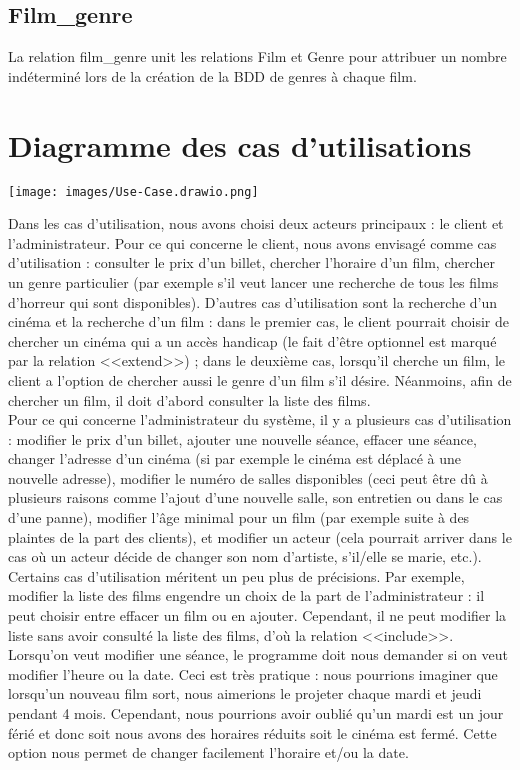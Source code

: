\documentclass[12pt]{article}
\begin{document}
\subsection{Film{\_}genre}
La relation film{\_}genre unit les relations Film et Genre pour attribuer un nombre indéterminé lors de la création de la BDD de genres à chaque film.
\section{Diagramme des cas d'utilisations}
\texttt{[image: images/Use-Case.drawio.png]}


Dans les cas d’utilisation, nous avons choisi deux acteurs principaux : 
le client et l’administrateur.  
Pour ce qui concerne le client, 
nous avons envisagé comme cas d’utilisation : 
consulter le prix d’un billet, chercher l’horaire d’un film, 
chercher un genre particulier (par exemple s’il veut lancer une 
recherche de tous les films d’horreur qui sont disponibles). 
D'autres cas d’utilisation sont la recherche d’un cinéma et la recherche 
d’un film : dans le premier cas, le client pourrait choisir de 
chercher un cinéma qui a un accès handicap (le fait d’être optionnel est 
marqué par la relation <<extend>>) ; dans le deuxième cas, lorsqu’il 
cherche un film, le client a l’option de chercher aussi le genre d’un film 
s’il désire. Néanmoins, afin de chercher un film, il doit d’abord consulter 
la liste des films.  \\
 
Pour ce qui concerne l’administrateur du système, il y a plusieurs cas d’utilisation 
: modifier le prix d’un billet, ajouter une nouvelle séance,
 effacer une séance, changer l’adresse d’un cinéma 
 (si par exemple le cinéma est déplacé à une nouvelle adresse), 
 modifier le numéro de salles disponibles (ceci peut être dû à plusieurs raisons comme 
 l’ajout d’une nouvelle salle, son entretien ou dans le cas d’une panne), modifier 
 l’âge minimal pour un film (par exemple suite à des plaintes de la part des clients), 
 et modifier un acteur (cela pourrait arriver dans le cas où un acteur décide de 
 changer son nom d'artiste, s’il/elle se marie, etc.). 
 Certains cas d’utilisation méritent un peu plus de précisions. 
 Par exemple, modifier la liste des films engendre un choix de la part 
 de l’administrateur : il peut choisir entre effacer un film ou en ajouter. Cependant, il ne peut modifier la liste sans avoir consulté la liste des films, d’où la relation <<include>>. Lorsqu’on veut modifier une séance, le programme doit nous demander si on veut modifier l’heure ou la date. Ceci est très pratique : nous pourrions imaginer que lorsqu’un nouveau film sort, nous aimerions le projeter chaque mardi et jeudi pendant 4 mois. Cependant, nous pourrions avoir oublié qu’un mardi est un jour férié et donc soit nous avons des horaires réduits soit le cinéma est fermé. Cette option nous permet de changer facilement l’horaire et/ou la date. 
\end{document}

